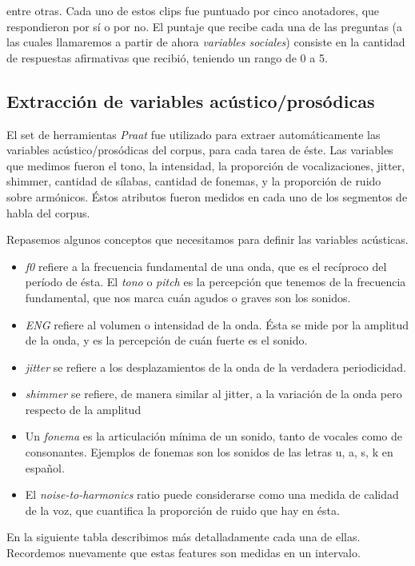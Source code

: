 entre otras. Cada uno de estos clips fue puntuado por cinco anotadores, que respondieron por sí o por no. El puntaje que recibe cada una de las preguntas (a las cuales llamaremos a partir de ahora \emph{variables sociales}) consiste en la cantidad de respuestas afirmativas que recibió, teniendo un rango de 0 a 5.

\subsection{Extracción de variables acústico/prosódicas}

El set de herramientas \emph{Praat} fue utilizado para extraer automáticamente las variables acústico/prosódicas del corpus, para cada tarea de éste. Las variables que medimos fueron el tono, la intensidad, la proporción de vocalizaciones, jitter, shimmer, cantidad de sílabas, cantidad de fonemas, y la proporción de ruido sobre armónicos. Éstos atributos fueron medidos en cada uno de los segmentos de habla del corpus.

Repasemos algunos conceptos que necesitamos para definir las variables acústicas.

\begin{itemize}
  \item \emph{f0} refiere a la frecuencia fundamental de una onda, que es el recíproco del período de ésta. El \emph{tono} o \emph{pitch} es la percepción que tenemos de la frecuencia fundamental, que nos marca cuán agudos o graves son los sonidos.
  \item \emph{ENG} refiere al volumen o intensidad de la onda. Ésta se mide por la amplitud de la onda, y es la percepción de cuán fuerte es el sonido.
  \item \emph{jitter} se refiere a los desplazamientos de la onda de la verdadera periodicidad.
  \item \emph{shimmer} se refiere, de manera similar al jitter, a la variación de la onda pero respecto de la amplitud
  \item Un \emph{fonema} es la articulación mínima de un sonido, tanto de vocales como de consonantes. Ejemplos de fonemas son los sonidos de las letras u, a, s, k en español.
  \item El \emph{noise-to-harmonics} ratio puede considerarse como una medida de calidad de la voz, que cuantifica la proporción de ruido que hay en ésta.
\end{itemize}


En la siguiente tabla describimos más detalladamente cada una de ellas. Recordemos nuevamente que estas features son medidas en un intervalo.


